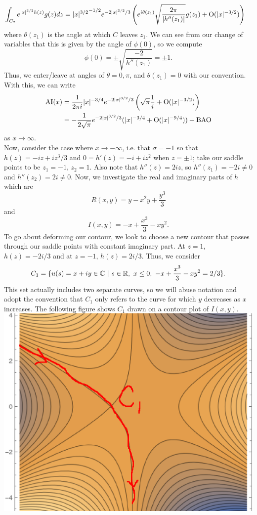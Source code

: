 \documentclass{article}
\begin{document}
\begin{align*}
\int_{C_2}e^{|x|^{3/2}h(z)}g(z)dz&={|x|^{3/2}}^{-1/2}e^{-2|x|^{3/2}/3}\left(e^{i\theta(z_1)}\sqrt{\frac{2\pi}{|h''(z_1)|}}g(z_1)+\operatorname{O}(|x|^{-3/2})\right)
\end{align*}
where $\theta(z_1)$ is the angle at which $C$ leaves $z_1$. We can see from our change of variables that this is given by the angle of $\phi(0)$, so we compute 
\[
\phi(0)=\pm\sqrt{\frac{-2}{h''(z_1)}}=\pm1.
\]
Thus, we enter/leave at angles of $\theta=0,\pi$, and $\theta(z_1)=0$ with our convention. With this, we can write 
\begin{align*}
\mathrm{AI}(x)&=\frac{1}{2\pi i}|x|^{-3/4}e^{-2|x|^{3/2}/3}\left(\sqrt{\pi}\frac{1}{i}+\operatorname{O}(|x|^{-3/2})\right)\\&=
-\frac{1}{2\sqrt{\pi}}e^{-2|x|^{3/2}/3}(|x|^{-3/4}+\operatorname{O}(|x|^{-9/4}))+\text{BAO}
\end{align*}
as $x\to\infty$.\\
\break
Now, consider the case where $x\to-\infty$, i.e. that $\sigma=-1$ so that $h(z)=-iz+iz^3/3$ and $0=h'(z)=-i+iz^2$ when $z=\pm1$; take our saddle points to be $z_1=-1$, $z_2=1$. Also note that $h''(z)=2iz$, so $h''(z_1)=-2i\neq0$ and $h''(z_2)=2i\neq0$. Now, we investigate the real and imaginary parts of $h$ which are 
\[
R(x,y)=y-x^2y+\frac{y^3}{3}
\]
and
\[
I(x,y)=-x+\frac{x^3}{3}-xy^2.
\]
To go about deforming our contour, we look to choose a new contour that passes through our saddle points with constant imaginary part. At $z=1$, $h(z)=-2i/3$ and at $z=-1$, $h(z)=2i/3$. Thus, we consider
\[
C_1=\{u(s)=x+iy\in\mathbb{C} ~|~s\in\mathbb{R},~ x\leq0, ~ -x+\frac{x^3}{3}-xy^2=2/3\}. 
\]
This set actually includes two separate curves, so we will abuse notation and adopt the convention that $C_1$ only refers to the curve for which $y$ decreases as $x$ increases. The following figure shows $C_1$ drawn on a contour plot of $I(x,y)$.\\
\includegraphics[scale=0.4]{568hw4fig2.eps}\\
\end{document}

